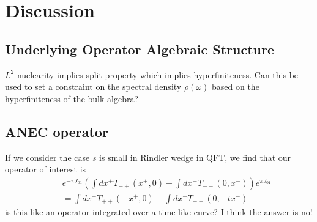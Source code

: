 \documentclass[a4paper,11pt]{article}
\theoremstyle{definition}
\newcommand{\nn}{\nonumber}
\newcommand{\lb}{\left(}
\newcommand{\rb}{\right)}
\newcommand{\mO}{\mathcal{O}}
\newcommand{\NL}[1]{\textcolor{blue}{#1}}
\newcommand{\p}{\partial}
\begin{document}


\section{Discussion}

\subsection{Underlying Operator Algebraic Structure}

$L^2$-nuclearity implies split property which implies hyperfiniteness. Can this be used to set a constraint on the spectral density $\rho(\omega)$ based on the hyperfiniteness of the bulk algebra?

\subsection{ANEC operator}
If we consider the case $s$ is small in Rindler wedge in QFT, we find that our operator of interest is 
\begin{eqnarray}
    &&e^{-\pi J_{01}}\lb  \int dx^+ T_{++}(x^+,0)-\int dx^- T_{--}(0,x^-)\rb e^{\pi J_{01}}\nn\\\
    &&=\int dx^+ T_{++}(-x^+,0)-\int dx^- T_{--}(0,-tx^-)
\end{eqnarray}
is this like an operator integrated over a time-like curve? I think the answer is no!
\end{document}
